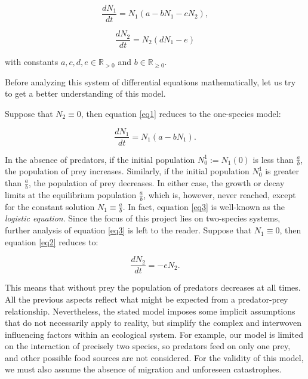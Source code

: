 \documentclass[11pt,a4paper]{scrartcl}
\theoremstyle{definition}
\begin{document}
\begin{equation} \label{eq1}
	\frac{dN_1}{dt}=N_1(a-bN_1-cN_2),
\end{equation}

\begin{equation} \label{eq2}
	\frac{dN_2}{dt}=N_2(dN_1-e)
\end{equation}

with constants $a,c,d,e \in \mathbb{R}_{>0}$ and $b \in \mathbb{R}_{\geqslant 0}$.
\newline

Before analyzing this system of differential equations mathematically, let us try to get a better understanding of this model.

Suppose that $N_2 \equiv 0$, then equation \eqref{eq1} reduces to the one-species model:

\begin{equation} \label{eq3}
	\frac{dN_1}{dt}=N_1(a-bN_1). 
\end{equation}

In the absence of predators, if the initial population $N_0^{1}:=N_1(0)$ is less than $\frac{a}{b}$, the population of prey increases. Similarly, if the initial population $N_0^{1}$ is greater than $\frac{a}{b}$, the population of prey decreases. In either case, the growth or decay limits at the equilibrium population $\frac{a}{b}$, which is, however, never reached, except for the constant solution $N_1 \equiv \frac{a}{b}$. In fact, equation \eqref{eq3} is well-known as the \textit{logistic equation}. Since the focus of this project lies on two-species systems, further analysis of equation \eqref{eq3} is left to the reader. Suppose that $N_1 \equiv 0$, then equation \eqref{eq2} reduces to:

\begin{equation} \label{eq4}
	\frac{dN_2}{dt}=-eN_2.
\end{equation}

This means that without prey the population of predators decreases at all times. All the previous aspects reflect what might be expected from a predator-prey relationship. Nevertheless, the stated model imposes some implicit assumptions that do not necessarily apply to reality, but simplify the complex and interwoven influencing factors within an ecological system. For example, our model is limited on the interaction of precisely two species, so predators feed on only one prey, and other possible food sources are not considered. For the validity of this model, we must also assume the absence of migration and unforeseen catastrophes. 
\end{document}
